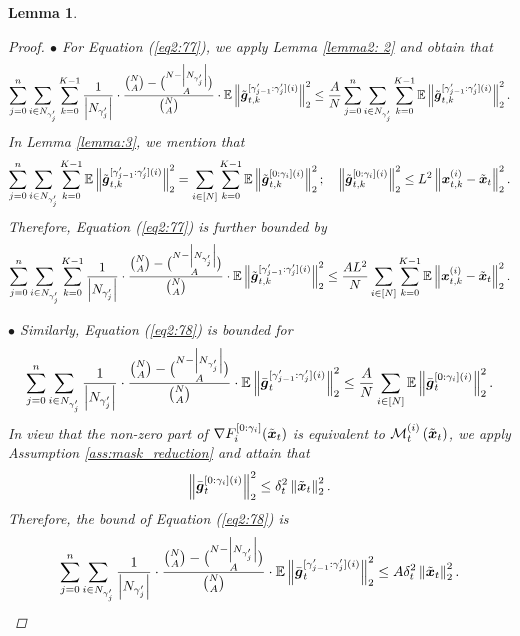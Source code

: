 \documentclass{article}
\theoremstyle{plain}
\newtheorem{lemma}[theorem]{Lemma}
\theoremstyle{definition}
\theoremstyle{remark}
\newcommand{\E}{\mathbb{E}}
\renewcommand{\eqref}[1]{Equation (\ref{#1})}
\newcommand{\bracket}[1]{\left(#1\right)}
\newcommand{\norm}[1]{\left\|#1\right\|_2^2}
\begin{document}
\begin{lemma}
\begin{proof}
$\bullet$ For \eqref{eq2:77}, we apply Lemma \ref{lemma2: 2} and obtain that
\begin{align}
\sum_{j=0}^{n} \sum_{i \in \n{j}} \sum_{k=0}^{K-1} \frac{1}{\left|\n{j}\right|} \cdot \frac{\binom{N}{A} - \binom{N - \left|\n{j}\right|}{A}}{\binom{N}{A}} \cdot \E \norm{ \tilde{\boldsymbol{g}}^{[\gamma_{j-1}':\gamma_{j}'] (i)}_{t, k} } \leq \frac{A}{N} \sum_{j=0}^{n} \sum_{i \in \n{j}} \sum_{k=0}^{K-1} \E \norm{ \tilde{\boldsymbol{g}}^{[\gamma_{j-1}':\gamma_{j}'] (i)}_{t, k} }.
\end{align}
In Lemma \ref{lemma:3}, we mention that 
\begin{align}
\sum_{j=0}^{n} \sum_{i \in \n{j}} \sum_{k=0}^{K-1} \E \norm{ \tilde{\boldsymbol{g}}^{[\gamma_{j-1}':\gamma_{j}'] (i)}_{t, k} } = \sum_{i \in [N]} \sum_{k=0}^{K-1} \E\norm{ \tilde{\boldsymbol{g}}^{[0:\gamma_{i}] (i)}_{t, k} }; \quad \norm{ \tilde{\boldsymbol{g}}^{[0:\gamma_{i}] (i)}_{t, k} } \leq L^2 \norm{\x{i}{t}{k} - \x{t}}.
\end{align}
Therefore, \eqref{eq2:77} is further bounded by
\begin{align}
\sum_{j=0}^{n} \sum_{i \in \n{j}} \sum_{k=0}^{K-1} \frac{1}{\left|\n{j}\right|} \cdot \frac{\binom{N}{A} - \binom{N - \left|\n{j}\right|}{A}}{\binom{N}{A}} \cdot \E \norm{ \tilde{\boldsymbol{g}}^{[\gamma_{j-1}':\gamma_{j}'] (i)}_{t, k} } \leq \frac{A L^2}{N} \sum_{i \in [N]} \sum_{k=0}^{K-1} \E\norm{\x{i}{t}{k} - \x{t}}. 
\end{align}

$\bullet$ Similarly, \eqref{eq2:78} is bounded for 
\begin{align}
\sum_{j=0}^{n} \sum_{i \in \n{j}} \frac{1}{\left|\n{j}\right|} \cdot \frac{\binom{N}{A} - \binom{N - \left|\n{j}\right|}{A}}{\binom{N}{A}} \cdot \E\norm{ \bar{\boldsymbol{g}}^{[\gamma_{j-1}':\gamma_{j}'](i)}_{t} } \leq \frac{A}{N} \sum_{i \in [N]} \E\norm{ \bar{\boldsymbol{g}}^{[0:\gamma_{i}](i)}_{t} }. 
\end{align}
In view that the non-zero part of $\nabla F_i^{[0: \gamma_i]}(\x{t})$ is equivalent to $\mask{i}{t}\bracket{\x{t}}$, we apply Assumption \ref{ass:mask_reduction} and attain that
\begin{align}
\norm{ \bar{\boldsymbol{g}}^{[0:\gamma_{i}](i)}_{t} } \leq \delta_t^2 \norm{\x{t}}. 
\end{align}
Therefore, the bound of \eqref{eq2:78} is 
\begin{align}
\sum_{j=0}^{n} \sum_{i \in \n{j}} \frac{1}{\left|\n{j}\right|} \cdot \frac{\binom{N}{A} - \binom{N - \left|\n{j}\right|}{A}}{\binom{N}{A}} \cdot \E\norm{ \bar{\boldsymbol{g}}^{[\gamma_{j-1}':\gamma_{j}'](i)}_{t} } \leq A \delta_t^2 \norm{\x{t}}. 
\end{align}


\end{proof}
\end{lemma}
\end{document}
